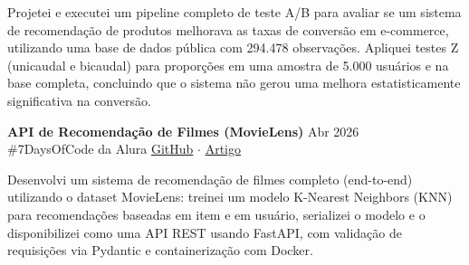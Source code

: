 \begin{zitemize}
\setlength{\itemsep}{0.1em}
    \item Projetei e executei um pipeline completo de teste A/B para avaliar se um sistema de recomendação de produtos melhorava as taxas de conversão em e-commerce, utilizando uma base de dados pública com 294.478 observações. Apliquei testes Z (unicaudal e bicaudal) para proporções em uma amostra de 5.000 usuários e na base completa, concluindo que o sistema não gerou uma melhora estatisticamente significativa na conversão.
\end{zitemize}
\vspace{0.2em}
\noindent
\textbf{API de Recomendação de Filmes (MovieLens)} \hfill Abr 2026 \\
\#7DaysOfCode da Alura \hfill \href{https://github.com/barlettab/movie-lens-model-api}{GitHub} $\cdot$ \href{https://medium.com/@barlettabc/recommendation-engines-how-to-build-one-with-movielens-65895e538da7}{Artigo}
\vspace{0.1em}
\begin{zitemize}
\setlength{\itemsep}{0.1em}
    \item Desenvolvi um sistema de recomendação de filmes completo (end-to-end) utilizando o dataset MovieLens: treinei um modelo K-Nearest Neighbors (KNN) para recomendações baseadas em item e em usuário, serializei o modelo e o disponibilizei como uma API REST usando FastAPI, com validação de requisições via Pydantic e containerização com Docker.
\end{zitemize}
\vspace{0.2em}